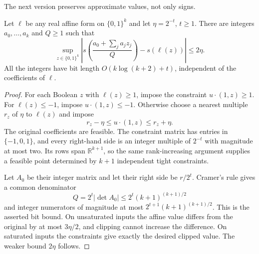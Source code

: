 The next version preserves approximate values, not only signs.
\begin{lemma}
\label{lem:boolean-rational-values}
Let $\ell$ be any real affine form on $\{0,1\}^k$ and let $\eta=2^{-t}$, $t\ge1$. There are integers $a_0,\ldots,a_k$ and $Q\ge1$ such that
\[
 \sup_{z\in\{0,1\}^k}
 \left|s\left(\frac{a_0+\sum_ja_jz_j}{Q}\right)-s(\ell(z))\right|
 \le2\eta.
\]
All the integers have bit length $O(k\log(k+2)+t)$, independent of the coefficients of $\ell$.
\end{lemma}
\begin{proof}
For each Boolean $z$ with $\ell(z)\ge1$, impose the constraint $u\cdot(1,z)\ge1$. For $\ell(z)\le-1$, impose $u\cdot(1,z)\le-1$. Otherwise choose a nearest multiple $r_z$ of $\eta$ to $\ell(z)$ and impose
\[
 r_z-\eta\le u\cdot(1,z)\le r_z+\eta.
\]
The original coefficients are feasible. The constraint matrix has entries in $\{-1,0,1\}$, and every right-hand side is an integer multiple of $2^{-t}$ with magnitude at most two. Its rows span $\mathbb R^{k+1}$, so the same rank-increasing argument supplies a feasible point determined by $k+1$ independent tight constraints.

Let $A_0$ be their integer matrix and let their right side be $r/2^t$. Cramer's rule gives a common denominator
\[
 Q=2^t|\det A_0|\le2^t(k+1)^{(k+1)/2}
\]
and integer numerators of magnitude at most
$2^{t+1}(k+1)^{(k+1)/2}$. This is the asserted bit bound. On unsaturated inputs the affine value differs from the original by at most $3\eta/2$, and clipping cannot increase the difference. On saturated inputs the constraints give exactly the desired clipped value. The weaker bound $2\eta$ follows.
\end{proof}

